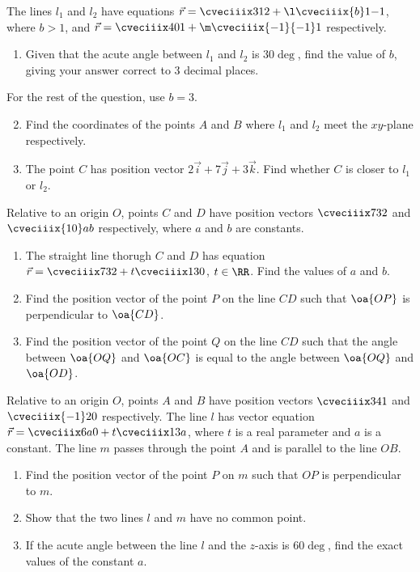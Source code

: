 \begin{problem}
    The lines $l_1$ and $l_2$ have equations $\vec r = \cveciiix312 + \l \cveciiix{b}1{-1}$, where $b > 1$, and $\vec r = \cveciiix401 + \m\cveciiix{-1}{-1}1$ respectively.

    \begin{enumerate}
        \item Given that the acute angle between $l_1$ and $l_2$ is $30\deg$, find the value of $b$, giving your answer correct to 3 decimal places.
    \end{enumerate}

    For the rest of the question, use $b = 3$.

    \begin{enumerate}
        \setcounter{enumi}{1}
        \item Find the coordinates of the points $A$ and $B$ where $l_1$ and $l_2$ meet the $xy$-plane respectively.
        \item The point $C$ has position vector $2\vec i + 7\vec j + 3\vec k$. Find whether $C$ is closer to $l_1$ or $l_2$.
    \end{enumerate}
\end{problem}

\begin{problem}
    Relative to an origin $O$, points $C$ and $D$ have position vectors $\cveciiix732$ and $\cveciiix{10}ab$ respectively, where $a$ and $b$ are constants.

    \begin{enumerate}
        \item The straight line thorugh $C$ and $D$ has equation $\vec r = \cveciiix732 + t\cveciiix130$, $t \in \RR$. Find the values of $a$ and $b$.
        \item Find the position vector of the point $P$ on the line $CD$ such that $\oa{OP}$ is perpendicular to $\oa{CD}$.
        \item Find the position vector of the point $Q$ on the line $CD$ such that the angle between $\oa{OQ}$ and $\oa{OC}$ is equal to the angle between $\oa{OQ}$ and $\oa{OD}$.
    \end{enumerate}
\end{problem}

\begin{problem}
    Relative to an origin $O$, points $A$ and $B$ have position vectors $\cveciiix341$ and $\cveciiix{-1}20$ respectively. The line $l$ has vector equation $\vec r = \cveciiix6a0 + t\cveciiix13a$, where $t$ is a real parameter and $a$ is a constant. The line $m$ passes through the point $A$ and is parallel to the line $OB$.

    \begin{enumerate}
        \item Find the position vector of the point $P$ on $m$ such that $OP$ is perpendicular to $m$.
        \item Show that the two lines $l$ and $m$ have no common point.
        \item If the acute angle between the line $l$ and the $z$-axis is $60\deg$, find the exact values of the constant $a$.
    \end{enumerate}
\end{problem}

